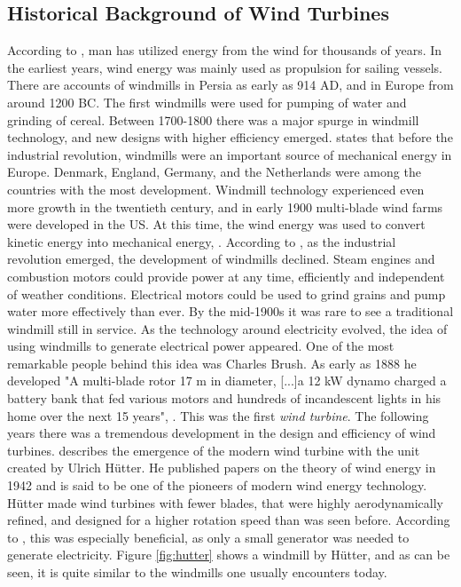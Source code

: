 \subsection{Historical Background of Wind Turbines}
According to \cite{Wagner2013}, man has utilized energy from the wind for thousands of years. In the earliest years, wind energy was mainly used as propulsion for sailing vessels. There are accounts of windmills in Persia as early as 914 AD, and in Europe from around 1200 BC. The first windmills were used for pumping of water and grinding of cereal. Between 1700-1800 there was a major spurge in windmill technology, and new designs with higher efficiency emerged. \cite{Lynn2011} states that before the industrial revolution, windmills were an important source of mechanical energy in Europe. Denmark, England, Germany, and the Netherlands were among the countries with the most development. Windmill technology experienced even more growth in the twentieth century, and in early 1900 multi-blade wind farms were developed in the US. At this time, the wind energy was used to convert kinetic energy into mechanical energy, \cite{Hau2013}. According to \cite{Lynn2011}, as the industrial revolution emerged, the development of windmills declined. Steam engines and combustion motors could provide power at any time, efficiently and independent of weather conditions. Electrical motors could be used to grind grains and pump water more effectively than ever. By the mid-1900s it was rare to see a traditional windmill still in service. \newline 
\newline
As the technology around electricity evolved, the idea of using windmills to generate electrical power appeared. One of the most remarkable people behind this idea was Charles Brush. As early as 1888 he developed "A multi-blade rotor 17 m in diameter, [...]a 12 kW dynamo charged a battery bank that fed various motors and hundreds of incandescent lights in his home over the next 15 years", \cite{Lynn2011}. This was the first \textit{wind turbine}. The following years there was a tremendous development in the design and efficiency of wind turbines. \cite{Hau2013} describes the emergence of the modern wind turbine with the unit created by Ulrich Hütter. He published papers on the theory of wind energy in 1942 and is said to be one of the pioneers of modern wind energy technology. Hütter made wind turbines with fewer blades, that were highly aerodynamically refined, and designed for a higher rotation speed than was seen before. According to \cite{Wagner2013}, this was especially beneficial, as only a small generator was needed to generate electricity. Figure \ref{fig:hutter} shows a windmill by Hütter, and as can be seen, it is quite similar to the windmills one usually encounters today. \newline
\newline


